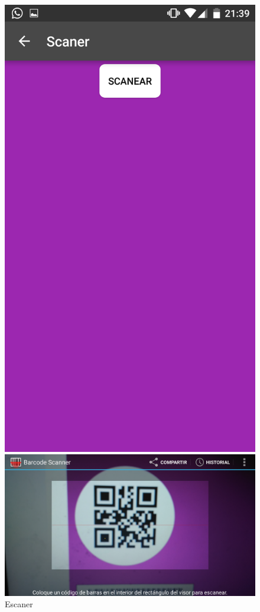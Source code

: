 \documentclass[a4paper,11pt]{book}
\begin{document}
\begin{figure}[H]
  \includegraphics[width=\linewidth]{imagenes/pruebas/movil/movil14.png}
  \caption{Escaner\cite{propio}}
\endminipage\hfill
{}
  \includegraphics[width=\linewidth]{imagenes/pruebas/movil/movil15.png}

\end{figure}
\end{document}
